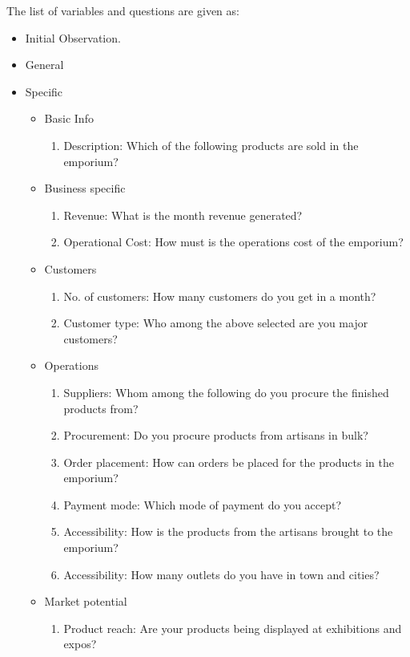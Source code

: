 \documentclass[oneside,twocolumn]{article}
\begin{document}
The list of variables and questions are given as:
\begin{itemize}
	\item Initial Observation.
	\item General
	\item Specific
		\begin{itemize}
			\item Basic Info
				\begin{enumerate}
					\item Description: Which of the following products are sold in the emporium?
				\end{enumerate}
			\item Business specific
				\begin{enumerate}
					\item Revenue: What is the month revenue generated?
					\item Operational Cost: How must is the operations cost of the emporium?
				\end{enumerate}
			\item Customers
				\begin{enumerate}
					\item No. of customers: How many customers do you get in a month?
					\item Customer type: Who among the above selected are you major customers?
				\end{enumerate}
			\item Operations
				\begin{enumerate}
					\item Suppliers: Whom among the following do you procure the finished products from?
					\item Procurement: Do you procure products from artisans in bulk?
					\item Order placement: How can orders be placed for the products in the emporium?
					\item Payment mode: Which mode of payment do you accept?
					\item Accessibility: How is the products from the artisans brought to the emporium?
					\item Accessibility: How many outlets do you have in town and cities?
				\end{enumerate}
			\item Market potential
				\begin{enumerate}
					\item Product reach: Are your products being displayed at exhibitions and expos?

\end{enumerate}
\end{itemize}
\end{itemize}
\end{document}
